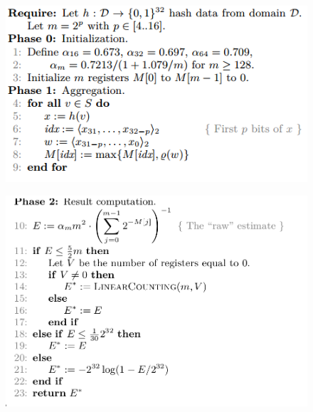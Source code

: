 \documentclass{beamer}
\begin{document}
\begin{frame}
\begin{figure}[H]
\includegraphics[scale=0.8]{HLL1.png}

\end{figure}
\end{frame}
\begin{frame}
\begin{figure}[H]
\includegraphics[scale=0.4]{HLL2.png}
\end{figure}
\end{frame}
\end{document}
